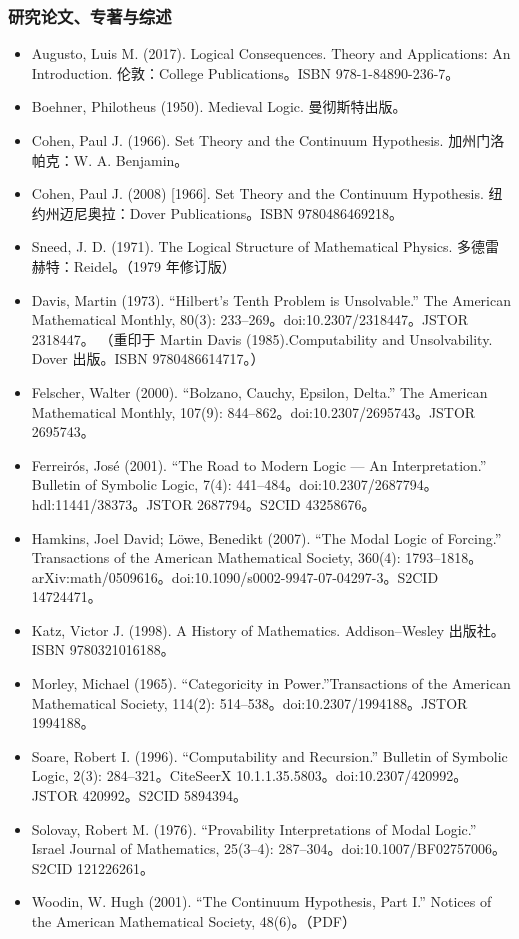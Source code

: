\subsubsection{研究论文、专著与综述}
\begin{itemize}
  \item Augusto, Luis M. (2017). Logical Consequences. Theory and Applications: An Introduction. 伦敦：College Publications。ISBN 978-1-84890-236-7。
  \item Boehner, Philotheus (1950). Medieval Logic. 曼彻斯特出版。
  \item Cohen, Paul J. (1966). Set Theory and the Continuum Hypothesis. 加州门洛帕克：W. A. Benjamin。
  \item Cohen, Paul J. (2008) [1966]. Set Theory and the Continuum Hypothesis. 纽约州迈尼奥拉：Dover Publications。ISBN 9780486469218。
  \item Sneed, J. D. (1971). The Logical Structure of Mathematical Physics. 多德雷赫特：Reidel。（1979 年修订版）
  \item Davis, Martin (1973). “Hilbert's Tenth Problem is Unsolvable.” The American Mathematical Monthly, 80(3): 233–269。doi:10.2307/2318447。JSTOR 2318447。  
  （重印于 Martin Davis (1985).Computability and Unsolvability. Dover 出版。ISBN 9780486614717。）
  \item Felscher, Walter (2000). “Bolzano, Cauchy, Epsilon, Delta.” The American Mathematical Monthly, 107(9): 844–862。doi:10.2307/2695743。JSTOR 2695743。
  \item Ferreirós, José (2001). “The Road to Modern Logic — An Interpretation.” Bulletin of Symbolic Logic, 7(4): 441–484。doi:10.2307/2687794。hdl:11441/38373。JSTOR 2687794。S2CID 43258676。
  \item Hamkins, Joel David; Löwe, Benedikt (2007). “The Modal Logic of Forcing.” Transactions of the American Mathematical Society, 360(4): 1793–1818。arXiv:math/0509616。doi:10.1090/s0002-9947-07-04297-3。S2CID 14724471。
  \item Katz, Victor J. (1998). A History of Mathematics. Addison–Wesley 出版社。ISBN 9780321016188。
  \item Morley, Michael (1965). “Categoricity in Power.”Transactions of the American Mathematical Society, 114(2): 514–538。doi:10.2307/1994188。JSTOR 1994188。
  \item Soare, Robert I. (1996). “Computability and Recursion.” Bulletin of Symbolic Logic, 2(3): 284–321。CiteSeerX 10.1.1.35.5803。doi:10.2307/420992。JSTOR 420992。S2CID 5894394。
  \item Solovay, Robert M. (1976). “Provability Interpretations of Modal Logic.” Israel Journal of Mathematics, 25(3–4): 287–304。doi:10.1007/BF02757006。S2CID 121226261。
  \item Woodin, W. Hugh (2001). “The Continuum Hypothesis, Part I.” Notices of the American Mathematical Society, 48(6)。（PDF）
\end{itemize}
